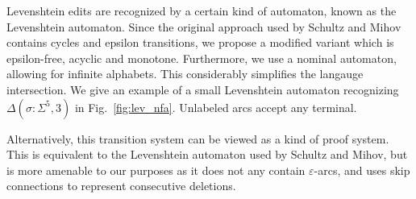 \documentclass[sigplan,review,anonymous,acmsmall]{acmart}\settopmatter{printfolios=false,printccs=false,printacmref=false}
\begin{document}
  Levenshtein edits are recognized by a certain kind of automaton, known as the Levenshtein automaton. Since the original approach used by Schultz and Mihov contains cycles and epsilon transitions, we propose a modified variant which is epsilon-free, acyclic and monotone. Furthermore, we use a nominal automaton, allowing for infinite alphabets. This considerably simplifies the langauge intersection. We give an example of a small Levenshtein automaton recognizing $\Delta(\sigma: \Sigma^5, 3)$ in Fig.~\ref{fig:lev_nfa}. Unlabeled arcs accept any terminal.

  \noindent Alternatively, this transition system can be viewed as a kind of proof system. This is equivalent to the Levenshtein automaton used by Schultz and Mihov, but is more amenable to our purposes as it does not any contain $\varepsilon$-arcs, and uses skip connections to represent consecutive deletions.


  \newcommand{\substitutionExample}{
    \tikz{
      \foreach \x in {0,8,16,24,32,40}{
        \fill (\x pt,0pt) circle [radius = 1pt];
        \fill (\x pt,8pt) circle [radius = 1pt];
      }
      \phantom{\fill (0pt,-8pt) circle [radius = 1pt];}
      \draw [-to] (0pt,0pt) -- (8pt,0pt);
      \draw [-to] (8pt,0pt) -- (16pt,0pt);
      \draw [-to] (16pt,0pt) -- (24pt,8pt);
      \draw [-to] (24pt,8pt) -- (32pt,8pt);
      \draw [-to] (32pt,8pt) -- (40pt,8pt);
    }
  }
\end{document}
